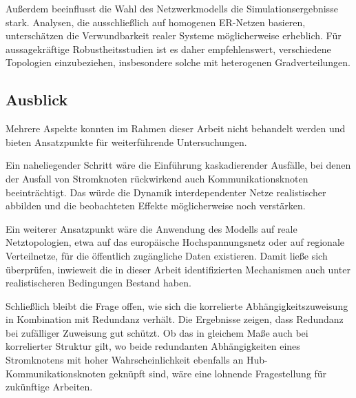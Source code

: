 Außerdem beeinflusst die Wahl des Netzwerkmodells die Simulationsergebnisse stark. Analysen, die ausschließlich auf homogenen ER-Netzen basieren, unterschätzen die Verwundbarkeit realer Systeme möglicherweise erheblich. Für aussagekräftige Robustheitsstudien ist es daher empfehlenswert, verschiedene Topologien einzubeziehen, insbesondere solche mit heterogenen Gradverteilungen.

\subsection{Ausblick}

Mehrere Aspekte konnten im Rahmen dieser Arbeit nicht behandelt werden und bieten Ansatzpunkte für weiterführende Untersuchungen.

Ein naheliegender Schritt wäre die Einführung kaskadierender Ausfälle, bei denen der Ausfall von Stromknoten rückwirkend auch Kommunikationsknoten beeinträchtigt. Das würde die Dynamik interdependenter Netze realistischer abbilden und die beobachteten Effekte möglicherweise noch verstärken.

Ein weiterer Ansatzpunkt wäre die Anwendung des Modells auf reale Netztopologien, etwa auf das europäische Hochspannungsnetz oder auf regionale Verteilnetze, für die öffentlich zugängliche Daten existieren. Damit ließe sich überprüfen, inwieweit die in dieser Arbeit identifizierten Mechanismen auch unter realistischeren Bedingungen Bestand haben.

Schließlich bleibt die Frage offen, wie sich die korrelierte Abhängigkeitszuweisung in Kombination mit Redundanz verhält. Die Ergebnisse zeigen, dass Redundanz bei zufälliger Zuweisung gut schützt. Ob das in gleichem Maße auch bei korrelierter Struktur gilt, wo beide redundanten Abhängigkeiten eines Stromknotens mit hoher Wahrscheinlichkeit ebenfalls an Hub-Kommunikationsknoten geknüpft sind, wäre eine lohnende Fragestellung für zukünftige Arbeiten.
